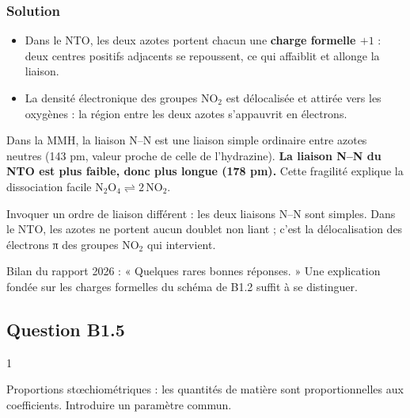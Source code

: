 \documentclass[11pt,a4paper]{article}
\providecommand{\tightlist}{\setlength{\itemsep}{0pt}\setlength{\parskip}{0pt}}
\begin{document}
\hypertarget{solution-26}{%
\subsubsection{Solution}\label{solution-26}}

\begin{itemize}
\tightlist
\item
  Dans le NTO, les deux azotes portent chacun une \textbf{charge formelle \(+1\)} : deux centres positifs adjacents se repoussent, ce qui affaiblit et allonge la liaison.
\item
  La densité électronique des groupes \(\mathrm{NO_2}\) est délocalisée et attirée vers les oxygènes : la région entre les deux azotes s'appauvrit en électrons.
\end{itemize}

Dans la MMH, la liaison N--N est une liaison simple ordinaire entre azotes neutres (143 pm, valeur proche de celle de l'hydrazine). \textbf{La liaison N--N du NTO est plus faible, donc plus longue (178 pm).} Cette fragilité explique la dissociation facile \(\mathrm{N_2O_4} \rightleftharpoons 2\,\mathrm{NO_2}\).

\begin{piege}

Invoquer un ordre de liaison différent : les deux liaisons N--N sont simples. Dans le NTO, les azotes ne portent aucun doublet non liant ; c'est la délocalisation des électrons π des groupes \(\mathrm{NO_2}\) qui intervient.

\end{piege}

\begin{jury}

Bilan du rapport 2026 : « Quelques rares bonnes réponses. » Une explication fondée sur les charges formelles du schéma de B1.2 suffit à se distinguer.

\end{jury}

\hypertarget{question-b1.5}{%
\subsection{Question B1.5}\label{question-b1.5}}

\begin{indication}{1}

Proportions stœchiométriques : les quantités de matière sont proportionnelles aux coefficients. Introduire un paramètre commun.

\end{indication}
\end{document}
